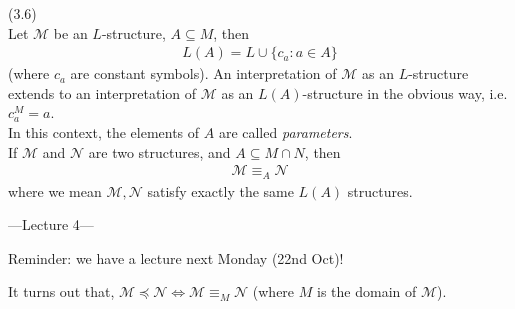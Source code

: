 \documentclass[a4paper]{article}
\begin{document}
\begin{defi} (3.6)\\
    Let $\mathcal{M}$ be an $L$-structure, $A \subseteq M$, then
    \begin{equation*}
        \begin{aligned}
            L(A) = L \cup \{c_a:a \in A\}
        \end{aligned}
    \end{equation*}
    (where $c_a$ are constant symbols). An interpretation of $\mathcal{M}$ as an $L$-structure extends to an interpretation of $\mathcal{M}$ as an $L(A)$-structure in the obvious way, i.e. $c_a^M = a$.\\
    In this context, the elements of $A$ are called \emph{parameters}.\\
    If $\mathcal{M}$ and $\mathcal{N}$ are two structures, and $A \subseteq M \cap N$, then
    \begin{equation*}
        \begin{aligned}
            \mathcal{M} \equiv_A \mathcal{N}
        \end{aligned}
    \end{equation*}
    where we mean $\mathcal{M},\mathcal{N}$ satisfy exactly the same $L(A)$ structures.
\end{defi}

---Lecture 4---

Reminder: we have a lecture next Monday (22nd Oct)!

\begin{prop}
    It turns out that, $\mathcal{M} \preccurlyeq \mathcal{N} \iff \mathcal{M} \equiv_M \mathcal{N}$ (where $M$ is the domain of $\mathcal{M}$).
\end{prop}
\end{document}
